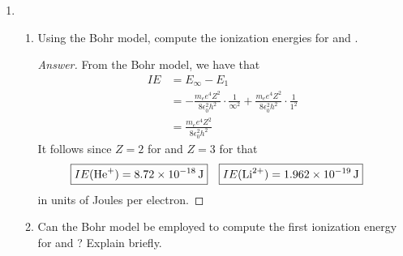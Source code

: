 \documentclass[../psets.tex]{subfiles}
\begin{document}
\begin{enumerate}
\begin{enumerate}
\begin{proof}[Answer]
            Plugging in $W=\SI{3.685e-19}{\joule}$ and $h=\SI{6.626e-34}{\joule\per\second}$, we have that
            \begin{align*}
                \Aboxed{\nu_t &= \SI{5.56e14}{\hertz}}&
                \Aboxed{\lambda_t &= \SI{5.39e-7}{\meter}}
            \end{align*}
        \end{proof}
        \item If UV light of wavelength $\lambda=\SI{3000}{\angstrom}$ is incident on the  surface, calculate the maximum kinetic energy of the electrons.
        \begin{proof}[Answer]
            From Einstein's annus mirabilis papers, we have that
            \begin{align*}
                KE_\text{max} &= h\nu-W\\
                &= \frac{hc}{\lambda}-W\\
                \Aboxed{KE_\text{max} &= \SI{2.941e-19}{\joule}}
            \end{align*}
        \end{proof}
    \end{enumerate}
    \item 
    \begin{enumerate}
        \item Using the Bohr model, compute the ionization energies for  and .
        \begin{proof}[Answer]
            From the Bohr model, we have that
            \begin{align*}
                IE &= E_\infty-E_1\\
                &= -\frac{m_ee^4Z^2}{8\epsilon_0^2h^2}\cdot\frac{1}{\infty^2}+\frac{m_ee^4Z^2}{8\epsilon_0^2h^2}\cdot\frac{1}{1^2}\\
                &= \frac{m_ee^4Z^2}{8\epsilon_0^2h^2}
            \end{align*}
            It follows since $Z=2$ for  and $Z=3$ for  that
            \begin{align*}
                \Aboxed{IE(\ce{He+}) &= \SI{8.72e-18}{\joule}}&
                \Aboxed{IE(\ce{Li^2+}) &= \SI{1.962e-19}{\joule}}
            \end{align*}
            in units of Joules per electron.
        \end{proof}
        \item Can the Bohr model be employed to compute the first ionization energy for  and ? Explain briefly.

\end{enumerate}
\end{enumerate}
\end{document}
